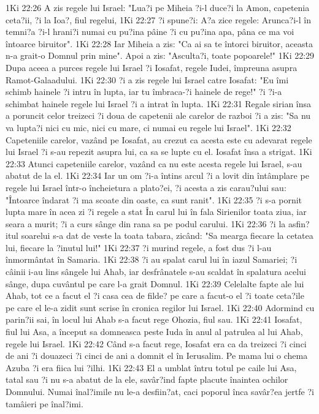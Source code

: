 1Ki 22:26  A zis regele lui Israel: "Lua?i pe Miheia ?i-l duce?i la Amon, capetenia ceta?ii, ?i la Ioa?, fiul regelui,
1Ki 22:27  ?i spune?i: A?a zice regele: Arunca?i-l în temni?a ?i-l hrani?i numai cu pu?ina pâine ?i cu pu?ina apa, pâna ce ma voi întoarce biruitor".
1Ki 22:28  Iar Miheia a zis: "Ca ai sa te întorci biruitor, aceasta n-a grait-o Domnul prin mine". Apoi a zis: "Asculta?i, toate popoarele!"
1Ki 22:29  Dupa aceea a purces regele lui Israel ?i Iosafat, regele Iudei, împreuna asupra Ramot-Galaadului.
1Ki 22:30  ?i a zis regele lui Israel catre Iosafat: "Eu îmi schimb hainele ?i intru în lupta, iar tu îmbraca-?i hainele de rege!" ?i ?i-a schimbat hainele regele lui Israel ?i a intrat în lupta.
1Ki 22:31  Regale sirian însa a poruncit celor treizeci ?i doua de capetenii ale carelor de razboi ?i a zis: "Sa nu va lupta?i nici cu mic, nici cu mare, ci numai eu regele lui Israel".
1Ki 22:32  Capeteniile carelor, vazând pe Iosafat, au crezut ca acesta este cu adevarat regele lui Israel ?i s-au repezit asupra lui, ca sa se lupte cu el. Iosafat însa a strigat.
1Ki 22:33  Atunci capeteniile carelor, vazând ca nu este acesta regele lui Israel, s-au abatut de la el.
1Ki 22:34  Iar un om ?i-a întins arcul ?i a lovit din întâmplare pe regele lui Israel într-o încheietura a plato?ei, ?i acesta a zis carau?ului sau: "Întoarce îndarat ?i ma scoate din oaste, ca sunt ranit".
1Ki 22:35  ?i s-a pornit lupta mare în acea zi ?i regele a stat În carul lui în fala Sirienilor toata ziua, iar seara a murit; ?i a curs sânge din rana sa pe podul carului.
1Ki 22:36  ?i la asfin?itul soarelui s-a dat de veste la toata tabara, zicând: "Sa mearga fiecare la cetatea lui, fiecare la ?inutul lui!"
1Ki 22:37  ?i murind regele, a fost dus ?i l-au înmormântat în Samaria.
1Ki 22:38  ?i au spalat carul lui în iazul Samariei; ?i câinii i-au lins sângele lui Ahab, iar desfrânatele s-au scaldat în spalatura acelui sânge, dupa cuvântul pe care l-a grait Domnul.
1Ki 22:39  Celelalte fapte ale lui Ahab, tot ce a facut el ?i casa cea de filde? pe care a facut-o el ?i toate ceta?ile pe care el le-a zidit sunt scrise în cronica regilor lui Israel.
1Ki 22:40  Adormind cu parin?ii sai, în locul lui Ahab s-a facut rege Ohozia, fiul sau.
1Ki 22:41  Iosafat, fiul lui Asa, a început sa domneasca peste Iuda în anul al patrulea al lui Ahab, regele lui Israel.
1Ki 22:42  Când s-a facut rege, Iosafat era ca da treizeci ?i cinci de ani ?i douazeci ?i cinci de ani a domnit el în Ierusalim. Pe mama lui o chema Azuba ?i era fiica lui ?ilhi.
1Ki 22:43  El a umblat întru totul pe caile lui Asa, tatal sau ?i nu s-a abatut de la ele, savâr?ind fapte placute înaintea ochilor Domnului. Numai înal?imile nu le-a desfiin?at, caci poporul înca savâr?ea jertfe ?i tamâieri pe înal?imi.
